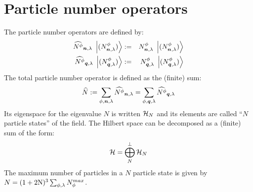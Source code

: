 \section{Particle number operators}

 The particle number operators are defined by:
\begin{eqnarray*}
\widehat{N^{\phi}}_{{\boldsymbol{n}}, {\lambda}} \ \left|{({N}^{\phi}_{{\boldsymbol{n}}, {\lambda}})}\right\rangle & := & {N}^{\phi}_{{\boldsymbol{n}}, {\lambda}} \ \left|{({N}^{\phi}_{{\boldsymbol{n}}, {\lambda}})}\right\rangle \\
\widehat{N^{\phi}}_{{\boldsymbol{q}}, {\lambda}} \ \left|{({N}^{\phi}_{{\boldsymbol{q}}, {\lambda}})}\right\rangle & := & {N}^{\phi}_{{\boldsymbol{q}}, {\lambda}} \ \left|{({N}^{\phi}_{{\boldsymbol{q}}, {\lambda}})}\right\rangle
\end{eqnarray*}
The total particle number operator is defined as the (finite) sum:
\begin{equation*}
\widehat{N} := \sum_{\phi,\boldsymbol{n},\lambda} \widehat{N^{\phi}}_{{\boldsymbol{n}}, {\lambda}} = \sum_{\phi,\boldsymbol{q},\lambda} \widehat{N^{\phi}}_{{\boldsymbol{q}}, {\lambda}}
\end{equation*}
Its eigenspace for the eigenvalue $N$ is written $\mathcal H_{N}$ and its elements are called ``$N$ particle states'' of the field. The Hilbert space can be decomposed as a (finite) sum of the form:
\begin{equation*}
\mathcal H = \bigoplus_{N}^\perp \mathcal H_{N}
\end{equation*}
The maximum number of particles in a $N$ particle state is given by $N = (1+2 \mathrm N)^3 \sum_{\phi,\lambda} N_{\phi}^{max}$.
